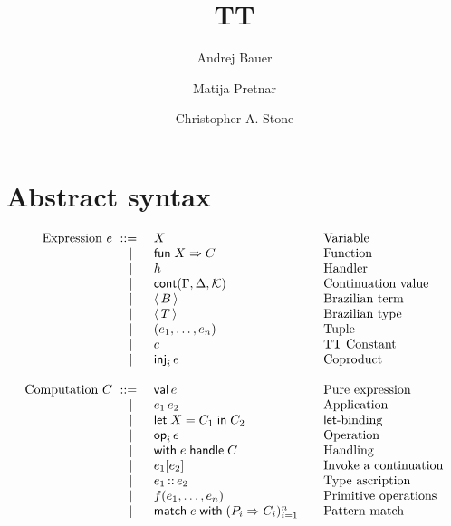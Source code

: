\documentclass{article}
\newcommand{\C}{C}     %
\newcommand{\X}{X}     %
\newcommand{\rgn}{r}   %
\newcommand{\B}{B}     %
\newcommand{\KK}{{\cal K}} %
\newcommand{\val}{\mathsf{val}\,} %
\newcommand{\letin}[1]{\mathsf{let}\; #1 \;\mathsf{in}\;} %
\newcommand{\opOp}[2][i]{\mathsf{op}_{#1}\,#2} %
\newcommand{\withhandle}[1]{\mathsf{with}\;#1\;\mathsf{handle}\;} %
\newcommand{\abs}[1]{\mathsf{abs}\;#1\;\mathsf{in}\;} %
\newcommand{\new}[2]{\mathsf{new}(#1,#2)} %
\newcommand{\fun}[1]{\mathsf{fun}\;#1\Rightarrow} %
\newcommand{\ttapp}[2]{#1\,#2} %
\newcommand{\kapp}[2]{#1{}[#2]} %
\newcommand{\bterm}[1]{\langle\,#1\,\rangle} %
\newcommand{\bty}[1]{\langle\,#1\,\rangle} %
\newcommand{\cont}[2][\G,\D]{\mathsf{cont}(#1,#2)}     %
\newcommand{\tuple}[1]{(#1)}
\newcommand{\generictuple}[1][n]{\tuple{e_1,\ldots,\e_{#1}}}
\newcommand{\pat}{P}
\newcommand{\match}[2]{\mathsf{match}\; #1\; \mathsf{with}\;#2}
\newcommand{\genericPats}[1][n]{(\pat_i \Rightarrow \C_i)_{i=1}^n}
\newcommand{\genericmatch}[1][\e]{\match{#1}{\genericPats}}
\renewcommand{\c}{c} %
\newcommand{\prim}[2][f]{#1(#2)} %
\newcommand{\genericprim}{\prim{\e_1,\ldots,\e_n}}
\newcommand{\inj}[2][i]{\mathsf{inj}_{#1}\, #2}
\begin{document}
\title{TT}
\author{Andrej Bauer \and Matija Pretnar \and Christopher A. Stone}
\maketitle

\section{Abstract syntax}
\label{sec:abstract-syntax}

\begin{equation*}
  \begin{array}{rl@{\qquad}l}
  \text{Expression $\e$}
    \bnf    & \X          & \text{Variable} \\
    \bnfor  & \fun{\X} \C  & \text{Function} \\
    \bnfor  & h           & \text{Handler} \\
    \bnfor  & \cont{\KK} & \text{Continuation value} \\
    \bnfor  & \bterm{\B}         & \text{Brazilian term} \\
    \bnfor  & \bty{\T}           & \text{Brazilian type} \\
    \bnfor  & \generictuple   & \text{Tuple}\\
    \bnfor  & \c              & \text{TT Constant}\\
    \bnfor  & \inj{\e}        & \text{Coproduct}\\
    \\
    \text{Computation $\C$}
      \bnf  & \val \e                & \text{Pure expression} \\
    \bnfor  & \ttapp{\e_1}{\e_2}   & \text{Application} \\
    \bnfor  & \letin{\X = \C_1} \C_2  & \text{$\mathsf{let}$-binding} \\
    \bnfor  & \opOp{\e} & \text{Operation} \\
    \bnfor  & \withhandle{\e} \C & \text{Handling} \\
    \bnfor  & \kapp{\e_1}{\e_2}   & \text{Invoke a continuation} \\
    \bnfor  & \ascribe{\e_1}{\e_2} & \text{Type ascription} \\
    \bnfor  & \genericprim & \text{Primitive operations}\\
    \bnfor  & \genericmatch& \text{Pattern-match}\\

\end{array}
\end{equation*}
\end{document}
